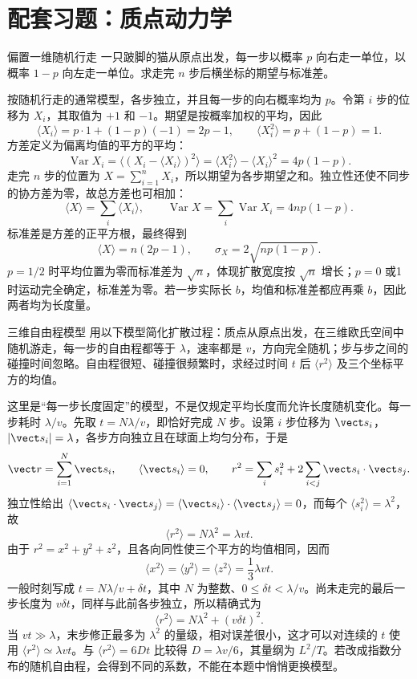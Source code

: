 \section{配套习题：质点动力学}
\label{r2ch02:sec:practice-point}

\begin{practicebox}{偏置一维随机行走}
一只跛脚的猫从原点出发，每一步以概率 $p$ 向右走一单位，以概率 $1-p$ 向左走一单位。求走完 $n$ 步后横坐标的期望与标准差。
\label{r2ch02:pr:001}
\begin{solution}
按随机行走的通常模型，各步独立，并且每一步的向右概率均为 $p$。令第 $i$ 步的位移为 $X_i$，其取值为 $+1$ 和 $-1$。期望是按概率加权的平均，因此
\[
 \langle X_i\rangle=p\cdot1+(1-p)(-1)=2p-1,
 \qquad \langle X_i^2\rangle=p+(1-p)=1.
\]
方差定义为偏离均值的平方的平均：
\[
 \operatorname{Var}X_i
 =\langle(X_i-\langle X_i\rangle)^2\rangle
 =\langle X_i^2\rangle-\langle X_i\rangle^2
 =4p(1-p).
\]
走完 $n$ 步的位置为 $X=\sum_{i=1}^nX_i$，所以期望为各步期望之和。独立性还使不同步的协方差为零，故总方差也可相加：
\[
 \langle X\rangle=\sum_i\langle X_i\rangle,
 \qquad \operatorname{Var}X=\sum_i\operatorname{Var}X_i=4np(1-p).
\]
标准差是方差的正平方根，最终得到
\[
 \boxed{\langle X\rangle=n(2p-1)},\qquad
 \boxed{\sigma_X=2\sqrt{np(1-p)}}.
\]
$p=1/2$ 时平均位置为零而标准差为 $\sqrt n$，体现扩散宽度按 $\sqrt n$ 增长；$p=0$ 或1时运动完全确定，标准差为零。若一步实际长 $b$，均值和标准差都应再乘 $b$，因此两者均为长度量。
\end{solution}
\end{practicebox}

\begin{practicebox}{三维自由程模型}
用以下模型简化扩散过程：质点从原点出发，在三维欧氏空间中随机游走，每一步的自由程都等于 $\lambda$，速率都是 $v$，方向完全随机；步与步之间的碰撞时间忽略。自由程很短、碰撞很频繁时，求经过时间 $t$ 后 $\langle r^2\rangle$ 及三个坐标平方的均值。
\label{r2ch02:pr:002}
\begin{solution}
这里是“每一步长度固定”的模型，不是仅规定平均长度而允许长度随机变化。每一步耗时 $\lambda/v$。先取 $t=N\lambda/v$，即恰好完成 $N$ 步。设第 $i$ 步位移为 $\vect s_i$，$|\vect s_i|=\lambda$，各步方向独立且在球面上均匀分布，于是
\[
 \vect r=\sum_{i=1}^N\vect s_i,\qquad
 \langle\vect s_i\rangle=0,\qquad
 r^2=\sum_i s_i^2+2\sum_{i<j}\vect s_i\cdot\vect s_j.
\]
独立性给出 $\langle\vect s_i\cdot\vect s_j\rangle
=\langle\vect s_i\rangle\cdot\langle\vect s_j\rangle=0$，而每个 $\langle s_i^2\rangle=\lambda^2$，故
\[
 \boxed{\langle r^2\rangle=N\lambda^2=\lambda vt}.
\]
由于 $r^2=x^2+y^2+z^2$，且各向同性使三个平方的均值相同，因而
\[
 \boxed{\langle x^2\rangle=\langle y^2\rangle=\langle z^2\rangle=\frac13\lambda vt}.
\]
一般时刻写成 $t=N\lambda/v+\delta t$，其中 $N$ 为整数、$0\leqslant\delta t<\lambda/v$。尚未走完的最后一步长度为 $v\delta t$，同样与此前各步独立，所以精确式为
\[
 \langle r^2\rangle=N\lambda^2+(v\delta t)^2.
\]
当 $vt\gg\lambda$，末步修正最多为 $\lambda^2$ 的量级，相对误差很小，这才可以对连续的 $t$ 使用 $\langle r^2\rangle\simeq\lambda vt$。与 $\langle r^2\rangle=6Dt$ 比较得 $D=\lambda v/6$，其量纲为 $L^2/T$。若改成指数分布的随机自由程，会得到不同的系数，不能在本题中悄悄更换模型。
\end{solution}
\end{practicebox}

